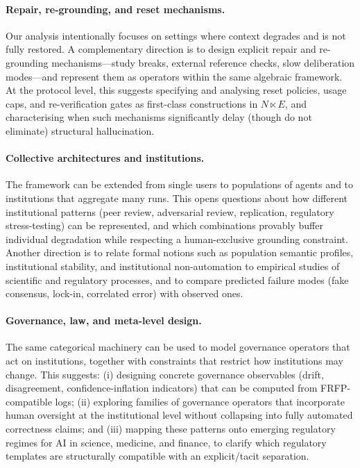 \paragraph{Repair, re-grounding, and reset mechanisms.}
Our analysis intentionally focuses on settings where context degrades and is not fully restored. A complementary direction is to design explicit repair and re-grounding mechanisms---study breaks, external reference checks, slow deliberation modes---and represent them as operators within the same algebraic framework. At the protocol level, this suggests specifying and analysing reset policies, usage caps, and re-verification gates as first-class constructions in \(N \ltimes E\), and characterising when such mechanisms significantly delay (though do not eliminate) structural hallucination.

\paragraph{Collective architectures and institutions.}
The framework can be extended from single users to populations of agents and to institutions that aggregate many runs. This opens questions about how different institutional patterns (peer review, adversarial review, replication, regulatory stress-testing) can be represented, and which combinations provably buffer individual degradation while respecting a human-exclusive grounding constraint. Another direction is to relate formal notions such as population semantic profiles, institutional stability, and institutional non-automation to empirical studies of scientific and regulatory processes, and to compare predicted failure modes (fake consensus, lock-in, correlated error) with observed ones.

\paragraph{Governance, law, and meta-level design.}
The same categorical machinery can be used to model governance operators that act on institutions, together with constraints that restrict how institutions may change. This suggests: (i) designing concrete governance observables (drift, disagreement, confidence-inflation indicators) that can be computed from FRFP-compatible logs; (ii) exploring families of governance operators that incorporate human oversight at the institutional level without collapsing into fully automated correctness claims; and (iii) mapping these patterns onto emerging regulatory regimes for AI in science, medicine, and finance, to clarify which regulatory templates are structurally compatible with an explicit/tacit separation.

